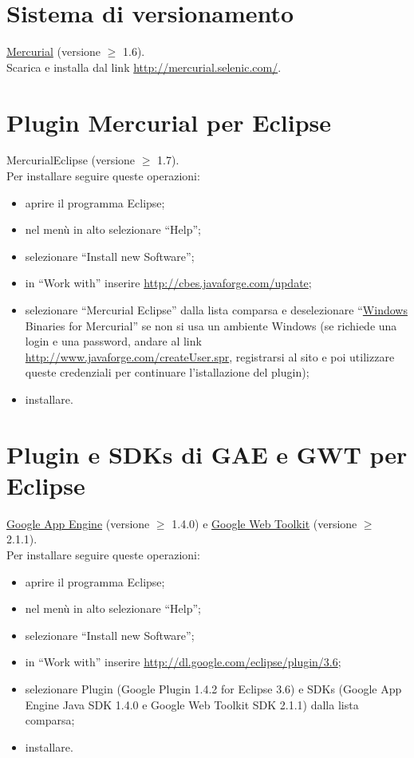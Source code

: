 \section{Sistema di versionamento}
\underline{Mercurial}  (versione $\geq$ 1.6). 
\\
Scarica e installa dal link
\url{http://mercurial.selenic.com/}.

\section{Plugin Mercurial per Eclipse}
MercurialEclipse (versione $\geq$ 1.7). 
\\
Per installare seguire queste
operazioni: 
\begin{itemize}
\item {aprire il programma Eclipse;} 
\item {nel men\`u in alto selezionare ``Help'';}
\item {selezionare ``Install new Software'';}
\item {in ``Work with'' inserire \url{http://cbes.javaforge.com/update};}
\item {selezionare ``Mercurial Eclipse'' dalla lista comparsa e deselezionare
``\underline{Windows} Binaries for Mercurial'' se non si usa un ambiente Windows
(se richiede una login e una password, andare al link
\url{http://www.javaforge.com/createUser.spr}, registrarsi al sito e poi
utilizzare queste credenziali per continuare l'istallazione del plugin);}
\item {installare.}
\end{itemize}

\section{Plugin e SDKs di GAE e GWT per Eclipse}
\underline{Google App Engine} (versione $\geq$ 1.4.0) e \underline{Google Web
Toolkit} (versione $\geq$ 2.1.1).
\\
Per installare seguire queste
operazioni: 
\begin{itemize}
\item {aprire il programma Eclipse;} 
\item {nel men\`u in alto selezionare ``Help'';}
\item {selezionare ``Install new Software'';}
\item {in ``Work with'' inserire \url{http://dl.google.com/eclipse/plugin/3.6};}
\item {selezionare Plugin (Google Plugin 1.4.2 for Eclipse 3.6) e SDKs (Google
App Engine Java SDK 1.4.0 e Google Web Toolkit SDK 2.1.1) dalla lista comparsa;}
\item {installare.}
\end{itemize} 

